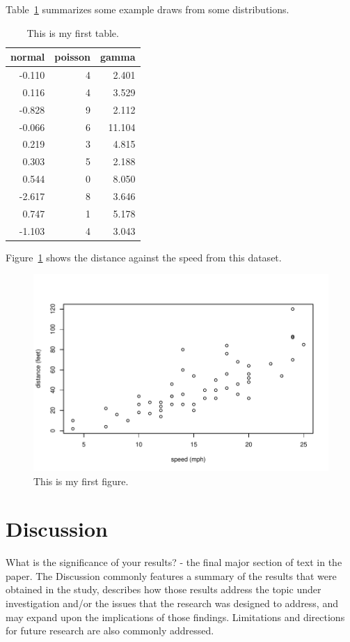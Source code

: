\documentclass[12pt]{article}
\begin{document}
Table~\ref{tab:rv} summarizes some example draws from some distributions.

\begin{table}[ht]
  \caption{This is my first table.}
  \label{tab:rv}
\centering
\begin{tabular}{rrr}
  \hline
normal & poisson & gamma \\ 
  \hline
-0.110 & 4 & 2.401 \\ 
  0.116 & 4 & 3.529 \\ 
  -0.828 & 9 & 2.112 \\ 
  -0.066 & 6 & 11.104 \\ 
  0.219 & 3 & 4.815 \\ 
  0.303 & 5 & 2.188 \\ 
  0.544 & 0 & 8.050 \\ 
  -2.617 & 8 & 3.646 \\ 
  0.747 & 1 & 5.178 \\ 
  -1.103 & 4 & 3.043 \\ 
   \hline
\end{tabular}
\end{table}

Figure~\ref{fig:cars} shows the distance against the speed from this dataset.

\begin{figure}
  \centering
  \includegraphics[width=\textwidth]{cars.pdf}
  \caption{This is my first figure.}
  \label{fig:cars}
\end{figure}

\section*{Discussion}
What is the significance of your results? - the final major section of text in the paper.  The Discussion commonly features a summary of the results that were obtained in the study, describes how those results address the topic under investigation and/or the issues that the research was designed to address, and may expand upon the implications of those findings.  Limitations and directions for future research are also commonly addressed.
\end{document}
